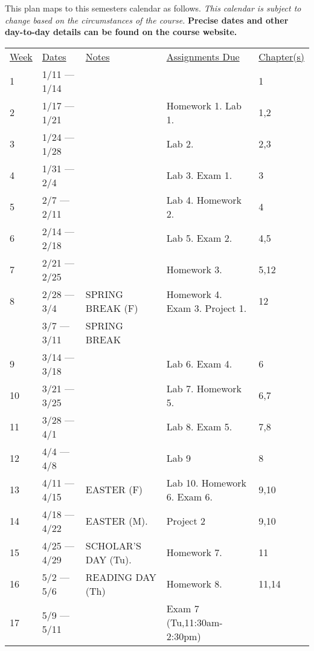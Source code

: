 \documentclass[10pt]{article}
\begin{document}
This plan maps to this semesters calendar as follows. \textit{This calendar is subject to change based on the circumstances of the course.} \textbf{Precise dates and other day-to-day details can be found on the course website.}

\begin{center}
\begin{tabular}{lllll}
\underline{Week} & \underline{Dates} & \underline{Notes} & \underline{Assignments Due} & \underline{Chapter(s)}\\
1 & 1/11 --- 1/14 & &  & 1  \\
2 & 1/17 --- 1/21 &  & Homework 1. Lab 1. & 1,2 \\
3 & 1/24 --- 1/28 & & Lab 2.  & 2,3 \\
4 & 1/31 --- 2/4 & &  Lab 3. Exam 1. & 3 \\
5 & 2/7 --- 2/11 & &  Lab 4. Homework 2. & 4\\
6 & 2/14 --- 2/18 & & Lab 5. Exam 2.  & 4,5 \\
7 & 2/21 --- 2/25 & & Homework 3. & 5,12 \\
8 & 2/28 --- 3/4 &  SPRING BREAK (F) &  Homework 4. Exam 3. Project 1. & 12 \\
& 3/7 --- 3/11 &  SPRING BREAK & \\
9 & 3/14 --- 3/18 & & Lab 6. Exam 4. & 6\\
10 & 3/21 --- 3/25 & & Lab 7. Homework 5. & 6,7\\
11 & 3/28 --- 4/1 & & Lab 8. Exam 5. & 7,8\\
12 & 4/4 --- 4/8 &  & Lab 9 & 8 \\
13 & 4/11 --- 4/15 & EASTER (F) & Lab 10. Homework 6. Exam 6. & 9,10 \\
14 & 4/18 --- 4/22 & EASTER (M). & Project 2 & 9,10 \\
15 & 4/25 --- 4/29 & SCHOLAR'S DAY (Tu). & Homework 7. & 11 \\
16 & 5/2 --- 5/6 & READING DAY (Th) & Homework 8. & 11,14 \\
17 & 5/9 --- 5/11 &  & Exam 7 (Tu,11:30am-2:30pm) &

\end{tabular}
\end{center}
\end{document}
